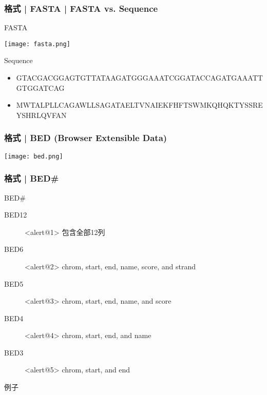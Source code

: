 \begin{frame}
  \frametitle{格式 | FASTA | FASTA vs. Sequence}
  \begin{block}{FASTA}
    \begin{center}
      \texttt{[image: fasta.png]}
    \end{center}
  \end{block}
  \begin{block}{Sequence}
    \begin{itemize}
      \item {\scriptsize GTACGACGGAGTGTTATAAGATGGGAAATCGGATACCAGATGAAATTGTGGATCAG}
      \item {\scriptsize MWTALPLLCAGAWLLSAGATAELTVNAIEKFHFTSWMKQHQKTYSSREYSHRLQVFAN}
    \end{itemize}
  \end{block}
\end{frame}

\begin{frame}
  \frametitle{格式 | BED (Browser Extensible Data)}
    \begin{center}
      \texttt{[image: bed.png]}
    \end{center}
\end{frame}

\begin{frame}
  \frametitle{格式 | \alert{BED\#}}
  \begin{block}{BED\#}
  \begin{description}
    \item[BED12]<alert@1> 包含全部12列
    \item[BED6]<alert@2> \alert{chrom, start, end, name, score, and strand}
    \item[BED5]<alert@3> chrom, start, end, name, and score
    \item[BED4]<alert@4> chrom, start, end, and name
    \item[BED3]<alert@5> chrom, start, and end
  \end{description}
\end{block}
\begin{block}{例子}
  \end{block}
\end{frame}

